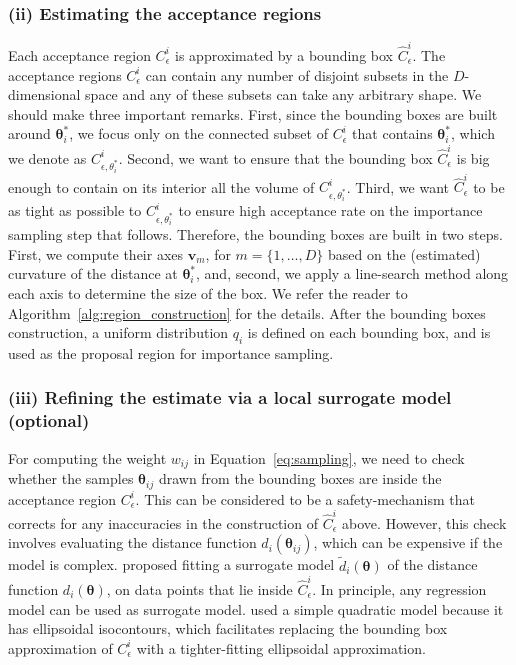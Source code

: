 \documentclass[article]{jss}
\newcommand{\thetab}{\boldsymbol{\theta}}
\newcommand{\accregioni}{C^i_{\epsilon}}
\newcommand{\accregionitheta}{C^i_{\epsilon, \theta_i^*}}
\newcommand{\accregionihat}{\hat{C}^i_{\epsilon}}
\begin{document}
\subsubsection*{(ii) Estimating the acceptance regions}

Each acceptance region \(\accregioni\) is approximated by a bounding
box \(\accregionihat\). The acceptance regions \(\accregioni\) can
contain any number of disjoint subsets in the \(D\)-dimensional space
and any of these subsets can take any arbitrary shape. We should make
three important remarks. First, since the bounding boxes are built
around \(\thetab_i^*\), we focus only on the connected subset of
\(\accregioni\) that contains \(\thetab_i^*\), which we denote as
\(\accregionitheta\). Second, we want to ensure that the bounding box
\(\accregionihat\) is big enough to contain on its interior all the
volume of \(\accregionitheta\). Third, we want \(\accregionihat\) to
be as tight as possible to \(\accregionitheta\) to ensure high
acceptance rate on the importance sampling step that
follows. Therefore, the bounding boxes are built in two steps. First,
we compute their axes \(\mathbf{v}_m\), for \(m = \{1, \ldots, D\}\)
based on the (estimated) curvature of the distance at \(\thetab_i^*\),
and, second, we apply a line-search method along each axis to
determine the size of the box. We refer the reader to
Algorithm~\ref{alg:region_construction} for the details. After the
bounding boxes construction, a uniform distribution \(q_i\) is defined
on each bounding box, and is used as the proposal region for
importance sampling.

\subsubsection*{(iii) Refining the estimate via a local surrogate model (optional)}

For computing the weight \(w_{ij}\) in Equation~\ref{eq:sampling}, we
need to check whether the samples \(\thetab_{ij}\) drawn from the
bounding boxes are inside the acceptance region \(\accregioni\). This
can be considered to be a safety-mechanism that corrects for any
inaccuracies in the construction of \(\accregionihat\) above. However,
this check involves evaluating the distance function
\(d_i(\thetab_{ij})\), which can be expensive if the model is
complex. \citet{Ikonomov2019} proposed fitting a surrogate model
\(\tilde{d}_i(\thetab)\) of the distance function \(d_i(\thetab)\), on
data points that lie inside \(\accregionihat\). In principle, any
regression model can be used as surrogate model. \citet{Ikonomov2019}
used a simple quadratic model because it has ellipsoidal isocontours,
which facilitates replacing the bounding box approximation of
\(\accregioni\) with a tighter-fitting ellipsoidal approximation.
\end{document}
